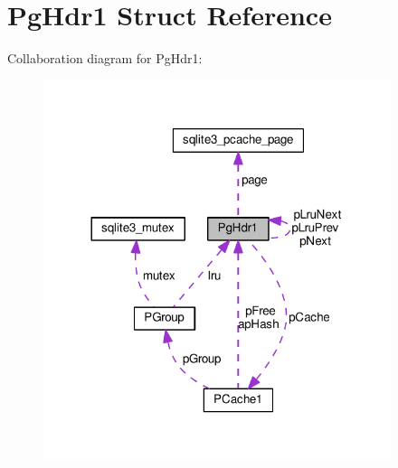 \hypertarget{structPgHdr1}{}\section{Pg\+Hdr1 Struct Reference}
\label{structPgHdr1}


Collaboration diagram for Pg\+Hdr1\+:\nopagebreak
\begin{figure}[H]
\begin{center}
\leavevmode
\includegraphics[width=288pt]{structPgHdr1__coll__graph}
\end{center}
\end{figure}
